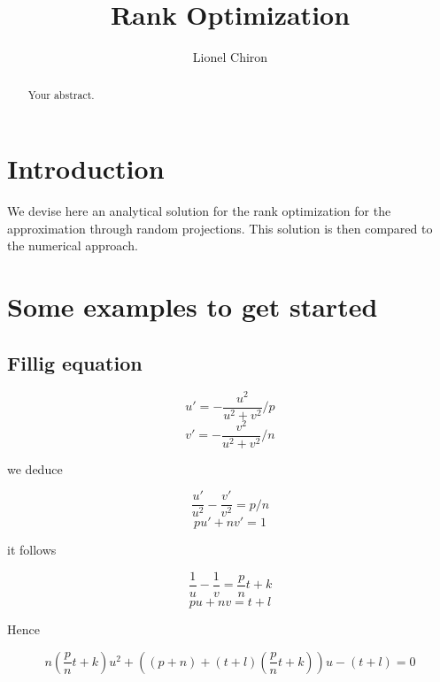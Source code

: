 \documentclass[a4paper]{article}
\title{Rank Optimization}
\author{Lionel Chiron}
\begin{document}
\maketitle

\begin{abstract}
Your abstract.
\end{abstract}

\section{Introduction}

We devise here an analytical solution for the rank optimization for the approximation through random projections.
This solution is then compared to the numerical approach.



\section{Some examples to get started}

\subsection{Fillig equation}

\begin{equation}
      u'= -\frac{u^2}{u^2+v^2}/p
\end{equation}
\begin{equation}
      v'= -\frac{v^2}{u^2+v^2}/n
\end{equation}

we deduce

\begin{equation}
    \frac{u'}{u^2} - \frac{v'}{v^2}= p/n
\end{equation}
\begin{equation}
    p u'+n v' = 1
\end{equation}

it follows

\begin{equation}
    \frac{1}{u} - \frac{1}{v}= \frac{p}{n}t+k
\end{equation}
\begin{equation}
    p u+n v = t+l
\end{equation}

Hence

\begin{equation}
    n(\frac{p}{n}t+k)u^2+((p+n)+(t+l)(\frac{p}{n}t+k))u-(t+l) = 0
\end{equation}
\end{document}
